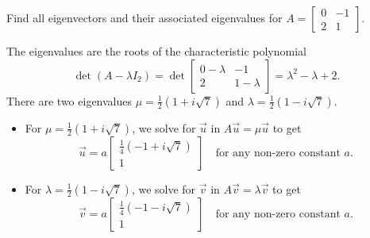 \documentclass[../main.tex]{subfiles}
\begin{document}
\begin{exercise}
  Find all eigenvectors and their associated eigenvalues for \(A = \begin{bmatrix} 0 & -1 \\ 2 & 1 \end{bmatrix}\).

  \begin{solution}
    The eigenvalues are the roots of the characteristic polynomial \[\det(A - \lambda I_{2}) = \det \begin{bmatrix} 0 - \lambda & -1 \\ 2 & 1 - \lambda \end{bmatrix} = \lambda^{2} - \lambda + 2.\]
    There are two eigenvalues \(\mu = \frac{1}{2}(1 + i\sqrt{7})\) and \(\lambda = \frac{1}{2}(1 - i\sqrt{7})\).

    \begin{itemize}
      \item For \(\mu = \frac{1}{2}(1 + i\sqrt{7})\), we solve for \(\vec{u}\) in \(A \vec{u} = \mu \vec{u}\) to get
        \[
          \vec{u} = a \begin{bmatrix} \frac{1}{4}(-1 + i\sqrt{7}) \\ 1 \end{bmatrix}
          \quad\text{for any non-zero constant } a.
        \]
      \item For \(\lambda = \frac{1}{2}(1 - i\sqrt{7})\), we solve for \(\vec{v}\) in \(A \vec{v} = \lambda \vec{v}\) to get
        \[
          \vec{v} = a \begin{bmatrix} \frac{1}{4}(-1 - i\sqrt{7}) \\ 1 \end{bmatrix}
          \quad\text{for any non-zero constant } a.
        \]
    \end{itemize}
  \end{solution}
\end{exercise}
\end{document}
